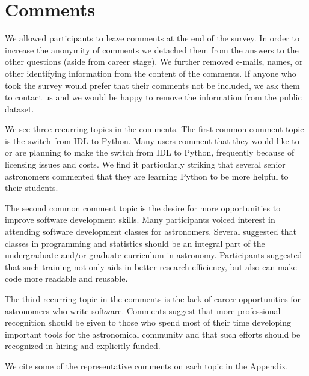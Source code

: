 \section{Comments}
\label{sec:comments}

We allowed participants to leave comments at the end of the survey. In order to increase the anonymity of comments we detached them from the answers to the other questions (aside from career stage). We further removed e-mails, names, or other identifying information from the content of the comments. If anyone who took the survey would prefer that their comments not be included, we ask them to contact us and we would be happy to remove the information from the public dataset. 

We see three recurring topics in the comments. The first common comment topic is the switch from IDL to Python. Many users comment that they would like to or are planning to make the switch from IDL to Python, frequently because of licensing issues and costs. We find it particularly striking that several senior astronomers commented that they are learning Python to be more helpful to their students.

The second common comment topic is the desire for more opportunities to improve software development skills. Many participants voiced interest in attending software development classes for astronomers. Several suggested that classes in programming and statistics should be an integral part of the undergraduate and/or graduate curriculum in astronomy. Participants suggested that such training not only aids in better research efficiency, but also can make code more readable and reusable. 

The third recurring topic in the comments is the lack of career opportunities for astronomers who write software. Comments suggest that more professional recognition should be given to those who spend most of their time developing important tools for the astronomical community and that such efforts should be recognized in hiring and explicitly funded. 

We cite some of the representative comments on each topic in the Appendix.

    
  